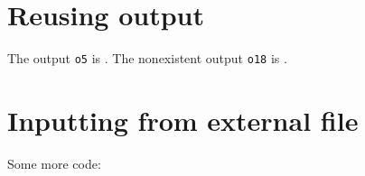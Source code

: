 \documentclass[12pt,a4paper]{amsart}
\begin{document}
\section{Reusing output}
The output {\tt o5} is .
The nonexistent output {\tt o18} is .

\section{Inputting from external file}
Some more code:

\end{document}
